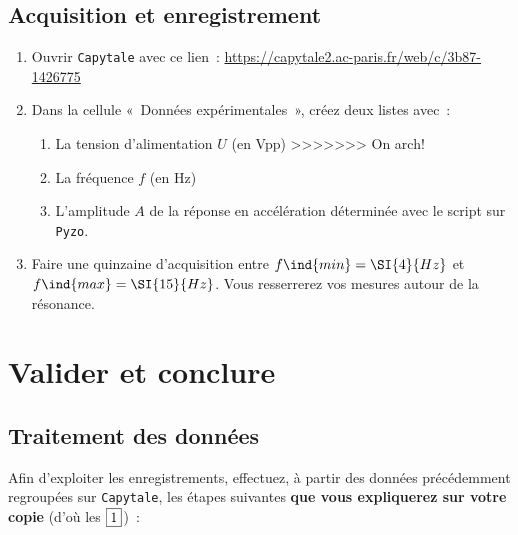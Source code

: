 \documentclass[a4paper, 11pt, final, garamond]{book}
\begin{document}
\subsection{Acquisition et enregistrement}

\begin{enumerate}
    \item Ouvrir \texttt{Capytale} avec ce lien~:
        \url{https://capytale2.ac-paris.fr/web/c/3b87-1426775}
    \item Dans la cellule «~Données expérimentales~», créez deux listes avec~:
        \begin{enumerate}
<<<<<<< refs/remotes/origin/master
=======
            \item La tension d'alimentation $U$ (en \si{Vpp})
>>>>>>> On arch!
            \item La fréquence $f$ (en \si{Hz})
            \item L'amplitude $A$ de la réponse en accélération déterminée avec le
                script sur \texttt{Pyzo}.
        \end{enumerate}
    \item Faire une quinzaine d'acquisition entre $f\ind{min} = \SI{4}{Hz}$ et
        $f\ind{max} = \SI{15}{Hz}$. Vous resserrerez vos mesures autour de
        la résonance.
\end{enumerate}

\section{Valider et conclure}
\subsection{Traitement des données}
Afin d'exploiter les enregistrements, effectuez, à partir des données
précédemment regroupées sur \texttt{Capytale}, les étapes suivantes \textbf{que
vous expliquerez sur votre copie} (d'où les $\fbox{1}$)~:
\end{document}
